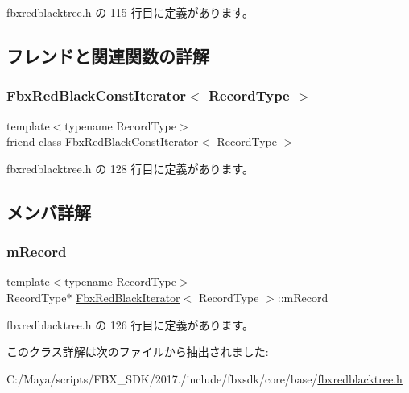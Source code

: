  fbxredblacktree.\+h の 115 行目に定義があります。



\subsection{フレンドと関連関数の詳解}
\mbox{\label{class_fbx_red_black_iterator_a66eff8e39f55f28a1d234cca0e5496bf}} 
\subsubsection{\texorpdfstring{Fbx\+Red\+Black\+Const\+Iterator$<$ Record\+Type $>$}{FbxRedBlackConstIterator< RecordType >}}
{\footnotesize\ttfamily template$<$typename Record\+Type$>$ \\
friend class \hyperlink{class_fbx_red_black_const_iterator}{Fbx\+Red\+Black\+Const\+Iterator}$<$ Record\+Type $>$\hspace{0.3cm}{\ttfamily [friend]}}



 fbxredblacktree.\+h の 128 行目に定義があります。



\subsection{メンバ詳解}
\mbox{\label{class_fbx_red_black_iterator_a7512ddb246f903b32ed0249619761403}} 
\subsubsection{\texorpdfstring{m\+Record}{mRecord}}
{\footnotesize\ttfamily template$<$typename Record\+Type$>$ \\
Record\+Type$\ast$ \hyperlink{class_fbx_red_black_iterator}{Fbx\+Red\+Black\+Iterator}$<$ Record\+Type $>$\+::m\+Record\hspace{0.3cm}{\ttfamily [protected]}}



 fbxredblacktree.\+h の 126 行目に定義があります。



このクラス詳解は次のファイルから抽出されました\+:\begin{DoxyCompactItemize}
\item 
C\+:/\+Maya/scripts/\+F\+B\+X\+\_\+\+S\+D\+K/2017./include/fbxsdk/core/base/\hyperlink{fbxredblacktree_8h}{fbxredblacktree.\+h}\end{DoxyCompactItemize}
